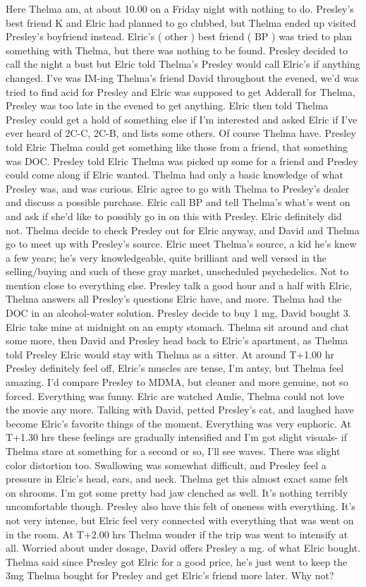 \documentclass[12pt]{book}
\begin{document}
Here Thelma am, at about 10.00 on a Friday night with nothing to do. Presley's best friend K and Elric had planned to go clubbed, but Thelma ended up visited Presley's boyfriend instead. Elric's ( other ) best friend ( BP ) was tried to plan something with Thelma, but there was nothing to be found. Presley decided to call the night a bust but Elric told Thelma's Presley would call Elric's if anything changed. I've was IM-ing Thelma's friend David throughout the evened, we'd was tried to find acid for Presley and Elric was supposed to get Adderall for Thelma, Presley was too late in the evened to get anything. Elric then told Thelma Presley could get a hold of something else if I'm interested and asked Elric if I've ever heard of 2C-C, 2C-B, and lists some others. Of course Thelma have. Presley told Elric Thelma could get something like those from a friend, that something was DOC. Presley told Elric Thelma was picked up some for a friend and Presley could come along if Elric wanted. Thelma had only a basic knowledge of what Presley was, and was curious. Elric agree to go with Thelma to Presley's dealer and discuss a possible purchase. Elric call BP and tell Thelma's what's went on and ask if she'd like to possibly go in on this with Presley. Elric definitely did not. Thelma decide to check Presley out for Elric anyway, and David and Thelma go to meet up with Presley's source. Elric meet Thelma's source, a kid he's knew a few years; he's very knowledgeable, quite brilliant and well versed in the selling/buying and such of these gray market, unscheduled psychedelics. Not to mention close to everything else. Presley talk a good hour and a half with Elric, Thelma answers all Presley's questions Elric have, and more. Thelma had the DOC in an alcohol-water solution. Presley decide to buy 1 mg, David bought 3. Elric take mine at midnight on an empty stomach. Thelma sit around and chat some more, then David and Presley head back to Elric's apartment, as Thelma told Presley Elric would stay with Thelma as a sitter. At around T+1.00 hr Presley definitely feel off, Elric's muscles are tense, I'm antsy, but Thelma feel amazing. I'd compare Presley to MDMA, but cleaner and more genuine, not so forced. Everything was funny. Elric are watched Amlie, Thelma could not love the movie any more. Talking with David, petted Presley's cat, and laughed have become Elric's favorite things of the moment. Everything was very euphoric. At T+1.30 hrs these feelings are gradually intensified and I'm got slight visuals- if Thelma stare at something for a second or so, I'll see waves. There was slight color distortion too. Swallowing was somewhat difficult, and Presley feel a pressure in Elric's head, ears, and neck. Thelma get this almost exact same felt on shrooms. I'm got some pretty bad jaw clenched as well. It's nothing terribly uncomfortable though. Presley also have this felt of oneness with everything. It's not very intense, but Elric feel very connected with everything that was went on in the room. At T+2.00 hrs Thelma wonder if the trip was went to intensify at all. Worried about under dosage, David offers Presley a mg. of what Elric bought. Thelma said since Presley got Elric for a good price, he's just went to keep the 3mg Thelma bought for Presley and get Elric's friend more later. Why not? 
\end{document}
